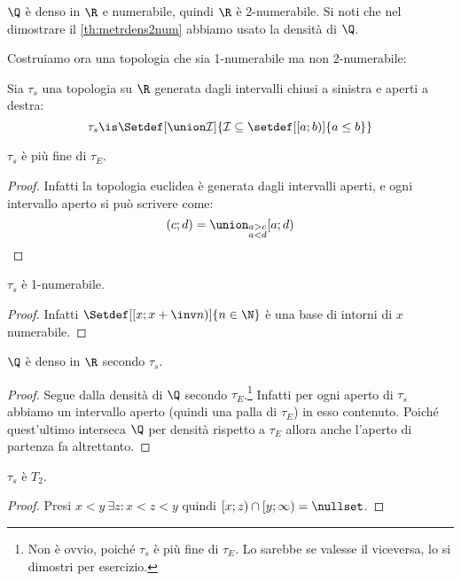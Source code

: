 \begin{es}
	$\Q$ è denso in $\R$ e numerabile, quindi $\R$ è 2-numerabile.
	Si noti che nel dimostrare il \autoref{th:metrdens2num} abbiamo usato la densità di $\Q$.
\end{es}

Costruiamo ora una topologia che sia 1-numerabile ma non 2-numerabile:

\begin{defn}
	Sia $\tau_s$ una topologia su $\R$ generata dagli intervalli chiusi a sinistra e aperti a destra:
	\[\tau_s\is\Setdef[\union\mathcal I]{\mathcal I\subseteq\setdef[[a;b)]{a\leq b}}\]
\end{defn}

\begin{prop}
	$\tau_s$ è più fine di $\tau_E$.
\end{prop}

\begin{proof}
	Infatti la topologia euclidea è generata dagli intervalli aperti,
	e ogni intervallo aperto si può scrivere come:
	\[(c;d)=\union_{\substack{a>c\\a<d}}[a;d)
	\qedhere\]
\end{proof}

\begin{prop}
	$\tau_s$ è 1-numerabile.
\end{prop}

\begin{proof}
	Infatti $\Setdef[\left[x;x+\inv n\right)]{n\in\N}$ è una base di intorni di $x$ numerabile.
\end{proof}

\begin{prop}
	$\Q$ è denso in $\R$ secondo $\tau_s$.
\end{prop}

\begin{proof}
	Segue dalla densità di $\Q$ secondo $\tau_E$.\footnote{Non è ovvio, poiché $\tau_s$ è più fine di $\tau_E$. Lo sarebbe se valesse il viceversa, lo si dimostri per esercizio.}
	Infatti per ogni aperto di $\tau_s$ abbiamo un intervallo aperto (quindi una palla di $\tau_E$) in esso contenuto. Poiché quest'ultimo interseca $\Q$ per densità rispetto a $\tau_E$ allora anche l'aperto di partenza fa altrettanto.
\end{proof}

\begin{prop}
	$\tau_s$ è $T_2$.
\end{prop}

\begin{proof}
	Presi $x<y\ \exists z:x<z<y$ quindi $[x;z)\cap[y;\infty)=\nullset$.
\end{proof}

